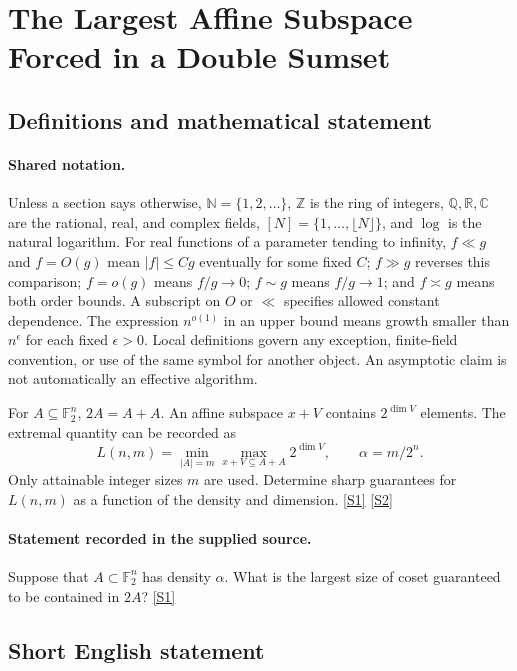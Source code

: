 \documentclass[11pt,a4paper]{article}
\newcommand{\N}{\mathbb{N}}
\newcommand{\Z}{\mathbb{Z}}
\newcommand{\Q}{\mathbb{Q}}
\newcommand{\R}{\mathbb{R}}
\newcommand{\C}{\mathbb{C}}
\newcommand{\F}{\mathbb{F}}
\newcommand{\sref}[2]{\hyperlink{source:#1:#2}{[S#2]}}
\begin{document}
\section{The Largest Affine Subspace Forced in a Double Sumset}\label{statement}


\subsection{Definitions and mathematical statement}

\paragraph{Shared notation.}Unless a section says otherwise, $\N=\{1,2,\ldots\}$,
$\Z$ is the ring of integers, $\Q,\R,\C$ are the rational, real, and complex
fields, $[N]=\{1,\ldots,\lfloor N\rfloor\}$, and $\log$ is the natural
logarithm. For real functions of a parameter tending to infinity,
$f\ll g$ and $f=O(g)$ mean $|f|\leq Cg$ eventually for some fixed $C$;
$f\gg g$ reverses this comparison; $f=o(g)$ means $f/g\to0$;
$f\sim g$ means $f/g\to1$; and $f\asymp g$ means both order bounds.
A subscript on $O$ or $\ll$ specifies allowed constant dependence.
The expression $n^{o(1)}$ in an upper bound means growth smaller than
$n^\epsilon$ for each fixed $\epsilon>0$. Local definitions govern any
exception, finite-field convention, or use of the same symbol for another
object. An asymptotic claim is not automatically an effective algorithm.



For $A\subseteq\F_2^n$, $2A=A+A$. An affine subspace $x+V$ contains $2^{\dim V}$ elements. The extremal quantity can be recorded as
\[L(n,m)=\min_{|A|=m}\max_{x+V\subseteq A+A}2^{\dim V},\qquad\alpha=m/2^n.\]
Only attainable integer sizes $m$ are used. Determine sharp guarantees for $L(n,m)$ as a function of the density and dimension. \sref{statement}{1} \sref{statement}{2}

\paragraph{Statement recorded in the supplied source.}
Suppose that $A \subset \mathbb{F}_2^n$ has density $\alpha$. What is the largest size of coset guaranteed to be contained in $2A$? \sref{statement}{1}

\subsection{Short English statement}
\end{document}
